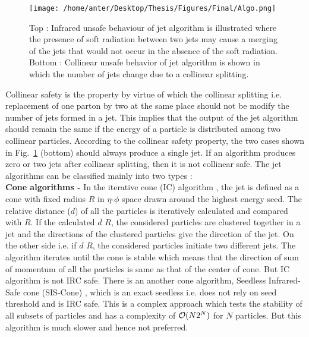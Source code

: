 \begin{figure}[h!]
\begin{center} 
\texttt{[image: /home/anter/Desktop/Thesis/Figures/Final/Algo.png]}\\
\caption[Illustration of infrared and collinear unsafe behaviour of jet algorithms.]{Top : Infrared unsafe behaviour of jet algorithm is illustrated where the presence of soft radiation between two jets may cause a merging of the jets that would not occur in the absence of the soft radiation. Bottom : Collinear unsafe behavior of jet algorithm is shown in which the number of jets change due to a collinear splitting\footnotemark.}
\label{fig:IRC}
\end{center}
\end{figure}  Collinear safety is the property by virtue of which the collinear splitting i.e. replacement of one parton by two at the same place should not be modify the number of jets formed in a jet. This implies that the output of the jet algorithm should remain the same if the energy of a particle is distributed among two collinear particles. According to the collinear safety property, the two cases shown in Fig.~\ref{fig:IRC} (bottom) should always produce a single jet. If an algorithm produces zero or two jets after collinear splitting, then it is not collinear safe. The jet algorithms can be classified mainly into two types : \\ \newline
{\bf Cone algorithms -} In the iterative cone (IC) algorithm \cite{Blazey:2000qt}, the jet is defined as a cone with fixed radius $R$ in $\eta$-$\phi$ space drawn around the highest energy seed. The relative distance ($d$) of all the particles is iteratively calculated and compared with $R$. If the calculated $d$ \ls $R$, the considered particles are clustered together in a jet and the directions of the clustered particles give the direction of the jet. On the other side i.e. if $d$ \gr $R$, the considered particles initiate two different jets. The algorithm iterates until the cone is stable which means that the direction of sum of momentum of all the particles is same as that of the center of cone. But IC algorithm is not IRC safe. There is an another cone algorithm, Seedless Infrared-Safe cone (SIS-Cone) \cite{Weinzierl:2011jx}, which is an exact seedless i.e. does not rely on seed threshold and is IRC safe. This is a complex approach which tests the stability of all subsets of particles and has a complexity of ${\cal O}(N2^{N})$ for $N$ particles. But this algorithm is much slower and hence not preferred. \\ \newline
